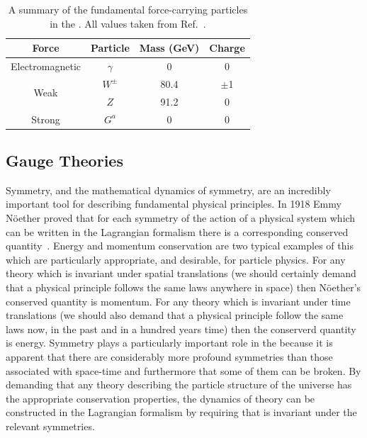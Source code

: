 \begin{table}
  \begin{tabular}{c | c c c}
  Force & Particle & Mass (GeV) & Charge \\
  \hline
  Electromagnetic & $\gamma$ & 0 & 0 \\
  \multirow{2}{*}{Weak} & $W^{\pm}$ & 80.4 & $\pm$1 \\
                        & $Z$   & 91.2 & 0 \\
  Strong                & $G^{a}$   & 0 & 0 \\   
  \end{tabular}
  \caption[A summary of the fundamental force-carrying particles in the \acs{SM}]{A summary of the fundamental force-carrying particles in the \SM. All values taken from Ref.~\cite{pdg}.}
  \label{tab:forces}
\end{table}

\subsection{Gauge Theories}

Symmetry, and the mathematical dynamics of symmetry, are an incredibly important tool for describing fundamental physical principles. In 1918 Emmy N\"{o}ether proved that for each symmetry of the action of a physical system which can be written in the Lagrangian formalism there is a corresponding conserved quantity~\cite{noether,noether_trans}. Energy and momentum conservation are two typical examples of this which are particularly appropriate, and desirable, for particle physics. For any theory which is invariant under spatial translations (we should certainly demand that a physical principle follows the same laws anywhere in space) then N\"{o}ether's conserved quantity is momentum. For any theory which is invariant under time translations (we should also demand that a physical principle follow the same laws now, in the past and in a hundred years time) then the conserverd quantity is energy. Symmetry plays a particularly important role in the \SM because it is apparent that there are considerably more profound symmetries than those associated with space-time and furthermore that some of them can be broken. By demanding that any theory describing the particle structure of the universe has the appropriate conservation properties, the dynamics of theory can be constructed in the Lagrangian formalism by requiring that is invariant under the relevant symmetries. 


